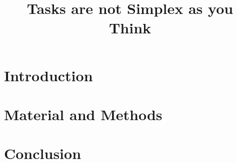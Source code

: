 \documentclass[12pt,twocolumn]{elsarticle}
\title{Tasks are not Simplex as you Think}
\author{}
\begin{document}
\maketitle
\section{Introduction}
\section{Material and Methods}
\section{Conclusion}

\end{document}
